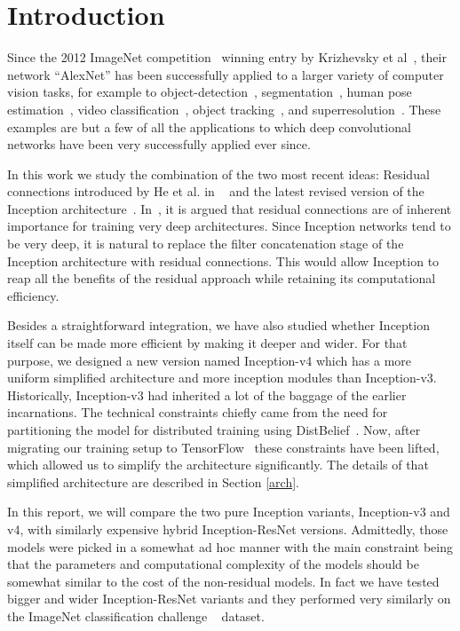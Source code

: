 \documentclass[10pt,twocolumn,letterpaper]{article}
\begin{document}
\section{Introduction}

Since the 2012 ImageNet competition~\cite{russakovsky2014imagenet}
winning entry by Krizhevsky et al~\cite{krizhevsky2012imagenet},
their network ``AlexNet'' has been successfully applied to a larger variety of
computer vision tasks, for example to object-detection~\cite{girshick2014rcnn},
segmentation~\cite{long2015fully}, human pose estimation~\cite{toshev2014deeppose},
video classification~\cite{karpathy2014large}, object
tracking~\cite{wang2013learning}, and superresolution~\cite{dong2014learning}.
These examples are but a few of all the applications to which deep
convolutional networks have been very successfully applied ever since.

In this work we study the combination of the two most recent ideas:
Residual connections introduced by He et al. in ~\cite{he2015deep} and the latest
revised version of the Inception architecture~\cite{szegedy2015rethinking}.
In~\cite{he2015deep}, it is argued that residual connections are of inherent
importance for training very deep architectures. Since Inception networks
tend to be very deep, it is natural to replace the
filter concatenation stage of the Inception architecture with residual connections. This
would allow Inception to reap all the benefits of the residual approach
while retaining its computational efficiency.

Besides a straightforward integration, we have also studied whether
Inception itself can be made more efficient by making it deeper and wider.
For that purpose, we designed a new version named Inception-v4
which has a more uniform simplified architecture and more inception modules
than Inception-v3. Historically, Inception-v3 had inherited a lot of the
baggage of the earlier incarnations. The technical constraints chiefly came from
the need for partitioning the model for distributed training using
DistBelief~\cite{dean2012large}.
Now, after migrating our training setup to TensorFlow~\cite{tensorflow2015-whitepaper}
these constraints have been lifted, which allowed us to simplify the architecture
significantly. The details of that simplified architecture are described in Section \ref{arch}.

In this report, we will compare the two pure Inception variants,
Inception-v3 and v4, with similarly expensive hybrid Inception-ResNet
versions. Admittedly, those models were picked in a somewhat ad hoc manner
with the main constraint being that the parameters and computational
complexity of the models should be somewhat similar to the cost
of the non-residual models. In fact we have tested bigger and wider
Inception-ResNet variants and they performed very similarly on the
ImageNet classification challenge ~\cite{russakovsky2014imagenet}
dataset.
\end{document}
